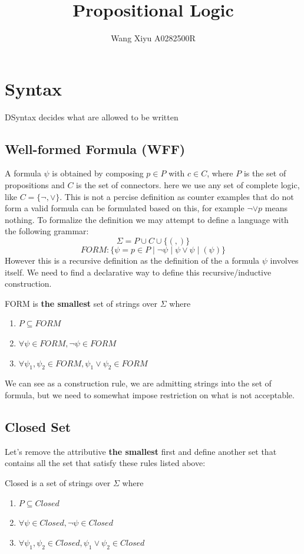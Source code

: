 \documentclass{article}
\newtheorem{definition}[theorem]{Definition}
\let\olddefinition\definition
\let\endolddefinition\enddefinition
\renewenvironment{definition}
  {\begin{tcolorbox}[
      colback=red!10,
      colframe=red!50!black,
      boxrule=0.6pt,
      arc=2pt,
      left=6pt,right=6pt,top=4pt,bottom=4pt,
      breakable
    ]\olddefinition}
  {\endolddefinition\end{tcolorbox}}
\begin{document}
\title{Propositional Logic}
\author{Wang Xiyu A0282500R}
\date{}
\maketitle
\tableofcontents
\newpage
\section{Syntax}
\begin{definition}
    DSyntax decides what are allowed to be written
\end{definition}
\subsection{Well-formed Formula (WFF)}
A formula $\psi$ is obtained by composing $p \in P$ with $c\in C$, where $P$ is the set of propositions and $C$ is the set of connectors. here we use
any set of complete logic, like $C = \{\neg, \lor\}$. This is not a percise definition as counter examples that do not form 
a valid formula can be formulated based on this, for example $\neg \lor p$ means nothing. To formalize the definition we may attempt to define a language with the following grammar:
\[\Sigma = P\cup C\cup \{(, )\}\]
\[FORM :\{\psi = p \in P \mid \neg \psi \mid \psi \lor \psi \mid (\psi) \}\]
However this is a recursive definition as the definition of the a formula $\psi$ involves itself. We need to find a declarative way to define this recursive/inductive construction. 
\begin{definition}
    FORM is \textbf{the smallest} set of strings over $\Sigma$ where 
    \begin{enumerate}
        \item $P \subseteq FORM$
        \item $\forall \psi \in FORM, \neg \psi \in FORM$
        \item $\forall \psi_1, \psi_2 \in FORM, \psi_1 \lor \psi_2 \in FORM$
    \end{enumerate}
\end{definition}
We can see as a construction rule, we are admitting strings into the set of formula, but we need to somewhat impose restriction on what is not acceptable. 
\subsection{Closed Set}
Let's remove the attributive \textbf{the smallest} first and define another set that contains all the set that satisfy these rules listed above:
\begin{definition}
    Closed is a set of strings over $\Sigma$ where 
    \begin{enumerate}
        \item $P \subseteq Closed $
        \item $\forall \psi \in Closed, \neg \psi \in Closed$
        \item $\forall \psi_1, \psi_2 \in Closed, \psi_1 \lor \psi_2 \in Closed$
    \end{enumerate}
\end{definition}
\end{document}
